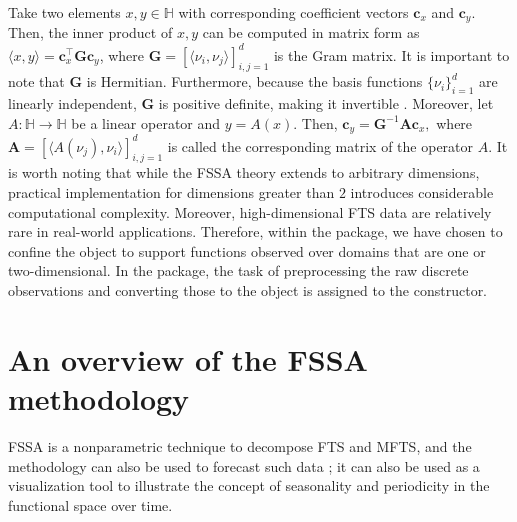Take two elements $x, y\in \mathbb{H}$ with corresponding coefficient vectors ${\pmb c}_x$ and ${\pmb c}_y.$ Then, the inner product of $x, y$ can be computed in matrix form as $\langle x,y \rangle={\pmb c}_x^\top \mathbf{G} {\pmb c}_y$, where $\mathbf{G}=[ \langle \nu_i,\nu_j \rangle ]_{i,j=1}^{d}$ is the Gram matrix.
It is important to note that $\mathbf{G}$ is Hermitian. Furthermore, because the basis functions $\{\nu_i\}_{i=1}^d$ are linearly independent, $\mathbf{G}$ is positive definite, making it invertible \citep[][Thm. 7.2.10]{horn2012matrix}.
Moreover, let $A:\mathbb{H}\rightarrow \mathbb{H}$ be a linear operator and $y=A(x).$ Then, ${\pmb c}_y= \mathbf{G}^{-1}\mathbf{A}{\pmb c}_x,$ where $\mathbf{A}=[ \langle A(\nu_j),\nu_i \rangle ]_{i,j=1}^{d}$ is called the corresponding matrix of the operator $A.$
It is worth noting that while the FSSA theory extends to arbitrary dimensions, practical implementation for dimensions greater than $2$ introduces considerable computational complexity. Moreover, high-dimensional FTS data are relatively rare in real-world applications. Therefore, within the  package, we have chosen to confine the  object to support functions observed over domains that are one or two-dimensional. In the  package, the task of preprocessing the raw discrete observations and converting those to the  object is assigned to the  constructor.
\section{An overview of the FSSA methodology}\label{sec:methodology}
FSSA is a nonparametric technique to decompose FTS and MFTS, and the methodology can also be used to forecast such data \citep{haghbin2021, trinka2022multivariate, trinka2023functional}; it can also be used as a visualization tool to illustrate the concept of seasonality and periodicity in the functional space over time.
